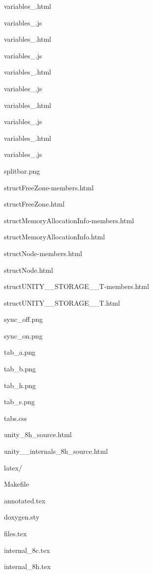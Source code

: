 \begin{DoxyItemize}
\begin{DoxyItemize}
\begin{DoxyItemize}
\begin{DoxyItemize}
\item variables\+\_.\+html
\item variables\+\_.\+js
\item variables\+\_.\+html
\item variables\+\_.\+js
\item variables\+\_.\+html
\item variables\+\_.\+js
\item variables\+\_.\+html
\item variables\+\_.\+js
\item variables\+\_.\+html
\item variables\+\_.\+js
\end{DoxyItemize}
\item splitbar.\+png
\item struct\+Free\+Zone-\/members.\+html
\item struct\+Free\+Zone.\+html
\item struct\+Memory\+Allocation\+Info-\/members.\+html
\item struct\+Memory\+Allocation\+Info.\+html
\item struct\+Node-\/members.\+html
\item struct\+Node.\+html
\item struct\+UNITY\+\_\+\+\_\+\+STORAGE\+\_\+\+\_\+\+T-\/members.\+html
\item struct\+UNITY\+\_\+\+\_\+\+STORAGE\+\_\+\+\_\+\+T.\+html
\item sync\+\_\+off.\+png
\item sync\+\_\+on.\+png
\item tab\+\_\+a.\+png
\item tab\+\_\+b.\+png
\item tab\+\_\+h.\+png
\item tab\+\_\+s.\+png
\item tabs.\+css
\item unity\+\_\+8h\+\_\+source.\+html
\item unity\+\_\+\+\_\+internals\+\_\+8h\+\_\+source.\+html
\end{DoxyItemize}
\item latex/
\begin{DoxyItemize}
\item Makefile
\item annotated.\+tex
\item doxygen.\+sty
\item files.\+tex
\item internal\+\_\+8c.\+tex
\item internal\+\_\+8h.\+tex

\end{DoxyItemize}
\end{DoxyItemize}
\end{DoxyItemize}
